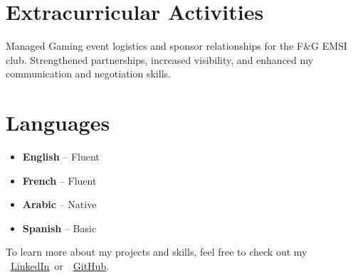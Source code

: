 \documentclass[12pt,a4paper,sans]{moderncv}
\begin{document}
    \section{Extracurricular Activities}
Managed Gaming event logistics and sponsor relationships for the F\&G EMSI club. Strengthened partnerships, increased visibility, and enhanced my communication and negotiation skills.

    \section{Languages}
    \begin{multicols}{2}
    \begin{itemize}[leftmargin=0.7cm, itemsep=2pt, topsep=2pt]
        \item \textbf{English} – Fluent
        \item \textbf{French} – Fluent
        \item \textbf{Arabic} – Native
        \item \textbf{Spanish} – Basic
    \end{itemize}
    \end{multicols}



\vspace{1em}
\begin{center}
    {\footnotesize\color{gray}
    To learn more about my projects and skills, feel free to check out my~
    \faLinkedin~\href{https://www.linkedin.com/in/ahmed-makroum/}{LinkedIn}~or~\faGithub~\href{https://github.com/ahmedmakroum}{GitHub}.}
\end{center}



    
\end{document}
